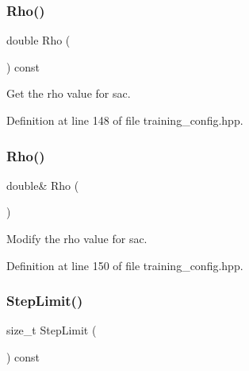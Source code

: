 \subsubsection{Rho()\hspace{0.1cm}{\footnotesize\ttfamily [1/2]}}
{\footnotesize\ttfamily double Rho (\begin{DoxyParamCaption}{ }\end{DoxyParamCaption}) const\hspace{0.3cm}{\ttfamily [inline]}}



Get the rho value for sac. 



Definition at line 148 of file training\+\_\+config.\+hpp.

\mbox{\label{classmlpack_1_1rl_1_1TrainingConfig_a10001faac75d91c05a3c0bfd711b901a}} 
\subsubsection{Rho()\hspace{0.1cm}{\footnotesize\ttfamily [2/2]}}
{\footnotesize\ttfamily double\& Rho (\begin{DoxyParamCaption}{ }\end{DoxyParamCaption})\hspace{0.3cm}{\ttfamily [inline]}}



Modify the rho value for sac. 



Definition at line 150 of file training\+\_\+config.\+hpp.

\mbox{\label{classmlpack_1_1rl_1_1TrainingConfig_ac5d0f7fbe2c8d6222464e0d828073051}} 
\subsubsection{Step\+Limit()\hspace{0.1cm}{\footnotesize\ttfamily [1/2]}}
{\footnotesize\ttfamily size\+\_\+t Step\+Limit (\begin{DoxyParamCaption}{ }\end{DoxyParamCaption}) const\hspace{0.3cm}{\ttfamily [inline]}}



